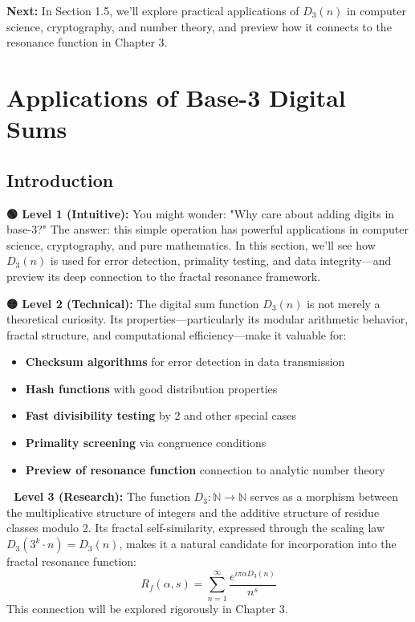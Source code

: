 \textbf{Next:} In Section 1.5, we'll explore practical applications of $D_3(n)$ in computer science, cryptography, and number theory, and preview how it connects to the resonance function in Chapter 3.



\section{Applications of Base-3 Digital Sums}
\label{sec:applications}

\subsection{Introduction}

\textbf{🟢 Level 1 (Intuitive):} You might wonder: "Why care about adding digits in base-3?" The answer: this simple operation has powerful applications in computer science, cryptography, and pure mathematics. In this section, we'll see how $D_3(n)$ is used for error detection, primality testing, and data integrity—and preview its deep connection to the fractal resonance framework.

\textbf{🟡 Level 2 (Technical):} The digital sum function $D_3(n)$ is not merely a theoretical curiosity. Its properties—particularly its modular arithmetic behavior, fractal structure, and computational efficiency—make it valuable for:
\begin{itemize}
\item \textbf{Checksum algorithms} for error detection in data transmission
\item \textbf{Hash functions} with good distribution properties
\item \textbf{Fast divisibility testing} by 2 and other special cases
\item \textbf{Primality screening} via congruence conditions
\item \textbf{Preview of resonance function} connection to analytic number theory
\end{itemize}

\textbf{🔴 Level 3 (Research):} The function $D_3: \mathbb{N} \to \mathbb{N}$ serves as a morphism between the multiplicative structure of integers and the additive structure of residue classes modulo 2. Its fractal self-similarity, expressed through the scaling law $D_3(3^k \cdot n) = D_3(n)$, makes it a natural candidate for incorporation into the fractal resonance function:
\begin{equation}
R_f(\alpha, s) = \sum_{n=1}^{\infty} \frac{e^{i\pi\alpha D_3(n)}}{n^s}
\end{equation}
This connection will be explored rigorously in Chapter 3.

